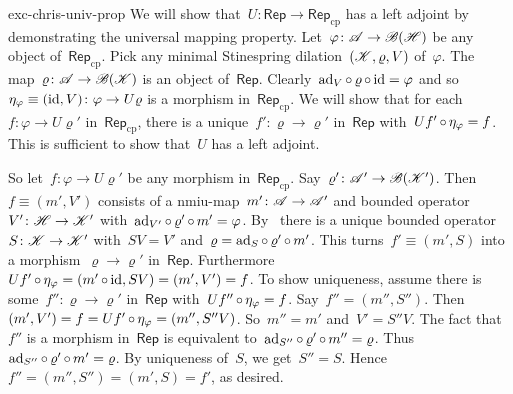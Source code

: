 \begin{solution}{exc-chris-univ-prop}%
We will show that~$U\colon \mathsf{Rep} \to \mathsf{Rep}_{\mathrm{cp}}$
    has a left adjoint by demonstrating the universal mapping property.
    Let~$\varphi\colon \mathscr{A} \to \mathscr{B}(\mathscr{H})$ be any object of~$\mathsf{Rep}_{\mathrm{cp}}$.
    Pick any minimal Stinespring dilation~$(\mathscr{K}, \varrho, V)$ of~$\varphi$.
The map~$\varrho\colon \mathscr{A}\to \mathscr{B}(\mathscr{K})$ is an object
        of~$\mathsf{Rep}$.
Clearly~$\mathrm{ad}_V \mathop{\circ} \varrho \mathop{\circ} \mathrm{id} = \varphi$
    and so~$\eta_\varphi\equiv (\mathrm{id},V)\colon \varphi \to U\varrho$
        is a morphism in~$\mathsf{Rep}_{\mathrm{cp}}$.
We will show that for each~$f\colon \varphi \to U\varrho'$
        in~$\mathsf{Rep}_{\mathrm{cp}}$,
    there is a unique~$f'\colon \varrho \to \varrho'$
    in~$\mathsf{Rep}$ with~$Uf' \mathop{\circ} \eta_\varphi = f$.
This is sufficient to show that~$U$
    has a left adjoint.

    So let~$f\colon \varphi\to U\varrho'$ be any morphism
        in~$\mathsf{Rep}_{\mathrm{cp}}$.
Say~$\varrho'\colon \mathscr{A}' \to \mathscr{B}(\mathscr{K}')$.
    Then~$f \equiv (m', V')$ consists of
    a nmiu-map~$m'\colon \mathscr{A} \to \mathscr{A}'$
    and bounded operator~$V' \colon \mathscr{H} \to \mathscr{K}'$
    with~$\mathrm{ad}_{V'} \mathop{\circ} \varrho' \mathop{\circ} m' = \varphi$.
By~
    there is a unique bounded operator~$S\colon \mathscr{K} \to \mathscr{K}'$
        with~$SV = V'$ and~$\varrho = \mathrm{ad}_S \mathop{\circ} \varrho' \mathop{\circ} m'$.
This turns~$f' \equiv(m',S)$ into a
    morphism~$\varrho \to \varrho'$ in~$\mathsf{Rep}$.
Furthermore~$Uf' \mathop{\circ} \eta_\varphi
                = (m' \mathop{\circ} \mathrm{id}, SV) = (m',V') = f$.
To show uniqueness, assume
        there is some~$f'' \colon \varrho \to \varrho'$
        in~$\mathsf{Rep}$
        with~$Uf'' \mathop{\circ} \eta_\varphi = f$.
Say~$f'' = (m'',S'')$.
    Then~$(m',V') = f = Uf' \mathop{\circ} \eta_\varphi = (m'', S''V)$.
So~$m''=m'$ and~$V' = S''V$.
The fact that~$f''$ is a morphism in~$\mathsf{Rep}$
    is
    equivalent to~$\mathrm{ad}_{S''} \mathop{\circ} \varrho' \mathop{\circ} m'' = \varrho$.
Thus~$\mathrm{ad}_{S''} \mathop{\circ} \varrho' \mathop{\circ} m' = \varrho$.
By uniqueness of~$S$, we get~$S'' = S$.
    Hence~$f''=(m'',S'') = (m',S) = f'$, as desired.
\end{solution}
